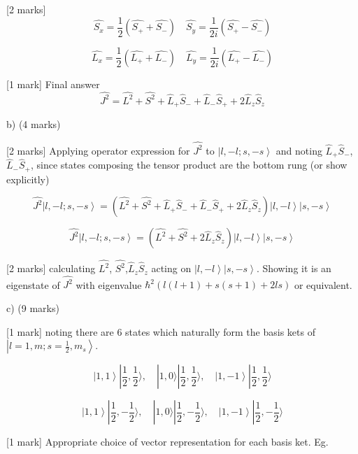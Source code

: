 [2 marks]  \[ \hat{S_{x}} = \frac{1}{2} (\hat{S_{+}} + \hat{S_{-}}) \quad \hat{S_{y}} = \frac{1}{2i} (\hat{S_{+}} - \hat{S_{-}}) \] 

\[ \hat{L_{x}} = \frac{1}{2} (\hat{L_{+}} + \hat{L_{-}}) \quad \hat{L_{y}} = \frac{1}{2i} (\hat{L_{+}} - \hat{L_{-}}) \]

[1 mark] Final answer \[ \hat{J^{2}} =  \hat{L^{2}} + \hat{S^{2}} + \hat{L}_{+}\hat{S}_{-} +  \hat{L}_{-}\hat{S}_{+} + 2\hat{L}_{z}\hat{S}_{z} \]

b) (4 marks)

[2 marks] Applying operator expression for \( \hat{J^{2}} \) to \( \left|l, -l; s, -s \right> \) and noting \( \hat{L}_{+}\hat{S}_{-} \), \( \hat{L}_{-}\hat{S}_{+} \), since states composing the tensor product are the bottom rung (or show explicitly)

\[ 
\hat{J^{2}}\left|l, -l; s, -s \right> = \left( \hat{L^{2}} + \hat{S^{2}} + \hat{L}_{+}\hat{S}_{-} +  \hat{L}_{-}\hat{S}_{+} + 2\hat{L}_{z}\hat{S}_{z} \right) \left|l, -l \right> \left|s, -s \right>  
\]

\[
\hat{J^{2}}\left|l, -l; s, -s \right> = \left( \hat{L^{2}} + \hat{S^{2}} + 2\hat{L}_{z}\hat{S}_{z} \right)  \left|l, -l \right> \left|s, -s \right>
\]

[2 marks] calculating \( \hat{L^{2}} \), \( \hat{S^{2}} \),\( \hat{L}_{z}\hat{S}_{z} \) acting on \( \left|l, -l \right> \left|s, -s \right> \). Showing it is an eigenstate of  \( \hat{J^{2}} \) with eigenvalue \( \hbar^2 \left ( l(l+1) + s(s+1) + 2ls \right ) \) or equivalent. 

c) (9 marks)

[1 mark] noting there are 6 states which naturally form the basis kets of \( \left|l=1, m; s=\frac{1}{2}, m_{s} \right> \).

\[ \left|1, 1 \right> |\frac{1}{2},\frac{1}{2} \rangle, \quad |1, 0 \rangle |\frac{1}{2}, \frac{1}{2} \rangle, \quad \left|1, -1 \right>|\frac{1}{2}, \frac{1}{2} \rangle \]

\[ \left|1, 1 \right> |\frac{1}{2},-\frac{1}{2} \rangle, \quad |1, 0 \rangle |\frac{1}{2}, -\frac{1}{2} \rangle, \quad \left|1, -1 \right>|\frac{1}{2}, -\frac{1}{2} \rangle \]

[1 mark] Appropriate choice of vector representation for each basis ket. Eg. 

